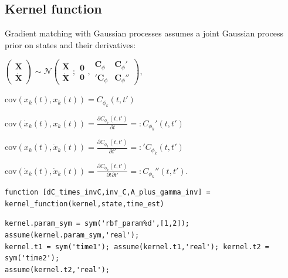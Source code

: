 
\begin{par}
\section{ Kernel function }
\end{par} \vspace{1em}
\begin{par}
Gradient matching with Gaussian processes assumes a joint Gaussian process prior on states and their derivatives:
\end{par} \vspace{1em}
\begin{par}
$\left(\begin{array}{c} \mathbf{X} \\ \dot{\mathbf{X}} \end{array}\right)  \sim \mathcal{N} \left( \begin{array}{c} \mathbf{X} \\ \dot{\mathbf{X}} \end{array}; \begin{array}{c}  \mathbf{0} \\ \mathbf{0}  \end{array}, \begin{array}{cc}  \mathbf{C}_{\phi} & \mathbf{C}_{\phi}' \\ '\mathbf{C}_{\phi} &  \mathbf{C}_{\phi}'' \end{array} \right)$,
\end{par} \vspace{1em}
\begin{par}
$\mathrm{cov}(x_k(t), x_k(t)) = C_{\phi_k}(t,t')$
\end{par} \vspace{1em}
\begin{par}
$\mathrm{cov}(\dot{x}_k(t), x_k(t)) = \frac{\partial C_{\phi_k}(t,t') }{\partial t} =: C_{\phi_k}'(t,t')$
\end{par} \vspace{1em}
\begin{par}
$\mathrm{cov}(x_k(t), \dot{x}_k(t)) = \frac{\partial C_{\phi_k}(t,t') }{\partial t'} =: {'C_{\phi_k}(t,t')}$
\end{par} \vspace{1em}
\begin{par}
$\mathrm{cov}(\dot{x}_k(t), \dot{x}_k(t)) = \frac{\partial C_{\phi_k}(t,t') }{\partial t \partial t'} =: C_{\phi_k}''(t,t')$.
\end{par} \vspace{1em}
\color{RoyalPurple}\begin{verbatim}
function [dC_times_invC,inv_C,A_plus_gamma_inv] = kernel_function(kernel,state,time_est)
\end{verbatim}
\color{black}
\color{RoyalPurple}\begin{verbatim}
kernel.param_sym = sym('rbf_param%d',[1,2]); assume(kernel.param_sym,'real');
kernel.t1 = sym('time1'); assume(kernel.t1,'real'); kernel.t2 = sym('time2');
assume(kernel.t2,'real');
\end{verbatim}
\color{black}

